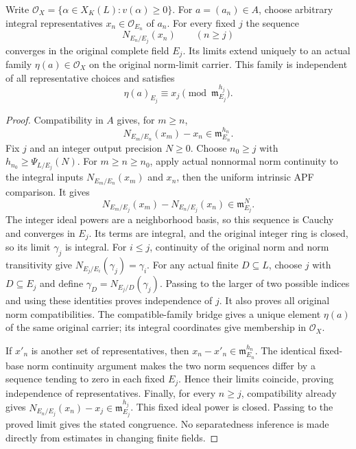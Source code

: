 \begin{lemma}
\label{fw:truncated-norm-reconstruction}
\leanok
Write $\mathcal O_X=\{\alpha\in X_K(L):v(\alpha)\geq0\}$.
For $a=(a_n)\in A$, choose arbitrary integral representatives
$x_n\in\mathcal O_{E_n}$ of $a_n$. For every fixed $j$ the sequence
\[
 N_{E_n/E_j}(x_n)\qquad(n\geq j)
\]
converges in the original complete field $E_j$. Its limits extend
uniquely to an actual family $\eta(a)\in\mathcal O_X$ on the original
norm-limit carrier. This family is independent of all representative
choices and satisfies
\[
 \eta(a)_{E_j}\equiv x_j\pmod{\mathfrak m_{E_j}^{h_j}}.
\]
\end{lemma}
\begin{proof}
Compatibility in $A$ gives, for $m\geq n$,
\[
 N_{E_m/E_n}(x_m)-x_n\in\mathfrak m_{E_n}^{h_n}.
\]
Fix $j$ and an integer output precision $N\geq0$.
Choose $n_0\geq j$ with $h_{n_0}\geq\Psi_{L/E_j}(N)$.
For $m\geq n\geq n_0$, apply actual nonnormal norm continuity to
the integral inputs $N_{E_m/E_n}(x_m)$ and $x_n$, then the uniform
intrinsic APF comparison. It gives
\[
 N_{E_m/E_j}(x_m)-N_{E_n/E_j}(x_n)
       \in\mathfrak m_{E_j}^{N}.
\]
The integer ideal powers are a neighborhood basis, so this sequence is
Cauchy and converges in $E_j$. Its terms are integral, and the original
integer ring is closed, so its limit $\gamma_j$ is integral.
For $i\leq j$, continuity of the original norm and norm transitivity
give $N_{E_j/E_i}(\gamma_j)=\gamma_i$.
For any actual finite $D\subseteq L$, choose $j$ with $D\subseteq E_j$
and define $\gamma_D=N_{E_j/D}(\gamma_j)$. Passing to the larger of two
possible indices and using these identities proves independence of $j$.
It also proves all original norm compatibilities. The compatible-family
bridge gives a unique element $\eta(a)$ of the same original carrier;
its integral coordinates give membership in $\mathcal O_X$.

If $x'_n$ is another set of representatives, then
$x_n-x'_n\in\mathfrak m_{E_n}^{h_n}$. The identical fixed-base norm
continuity argument makes the two norm sequences differ by a sequence
tending to zero in each fixed $E_j$. Hence their limits coincide,
proving independence of representatives. Finally, for every $n\geq j$,
compatibility already gives
$N_{E_n/E_j}(x_n)-x_j\in\mathfrak m_{E_j}^{h_j}$.
This fixed ideal power is closed. Passing to the proved limit gives
the stated congruence. No separatedness inference is made directly
from estimates in changing finite fields.
\end{proof}

